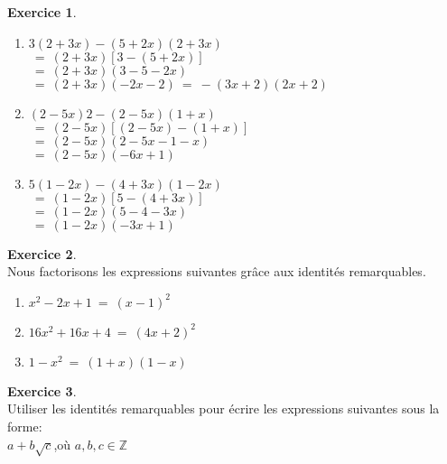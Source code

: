\documentclass[10pt,a4paper]{article}
\theoremstyle{definition}
\theoremstyle{definition}
\newtheorem{exo}{Exercice}
\begin{document}
\begin{center}
\begin{minipage}[c]{0.4\linewidth}
\begin{exo}
				\begin{enumerate}
					\item $3(2 + 3x) - (5 + 2x)(2 + 3x)$\\
					$\ = \ (2 + 3x)\left[3 - (5 + 2x)\right]$\\
					$\ = \ (2 + 3x)(3 - 5 - 2x) $\\
					$  \  =  \  (2 + 3x)(-2x-2)  \  =  \ - (3x+2)(2x+2) $
					\item $(2 - 5x)2 - (2 - 5x)(1 + x)$\\
					$ \ = \ (2 - 5x)\left[(2 - 5x) - (1 + x)\right] $\\
					$ \ = \ (2 - 5x)(2 - 5x - 1 - x) $\\
					$ \ = \ (2 - 5x)(- 6x + 1) $
					\item $5(1 - 2x) - (4 + 3x)(1-2x)$\\
					$ \ = \ (1 - 2x)\left[ 5 - (4 + 3x)\right]$\\
					$ \ = \ (1 - 2x)(5 - 4 - 3x)$\\
					$ \ = \ (1 - 2x)( - 3x + 1)$
				\end{enumerate}
			
		\end{exo}
		\begin{exo}\quad\hfill\textbf{}\\
			Nous factorisons les expressions suivantes grâce aux identités remarquables.
		
				\begin{enumerate}
					\item $x^2-2x+1  \ = \ (x-1)^2$
					\item $16x^2+16x+4 \ = \ (4x+2)^2 $
					
					\item $1-x^2  \ =  \ (1+x)(1-x)$
				\end{enumerate}

		\end{exo}
		\begin{exo}\quad\hfill\textbf{}\\
			Utiliser les identités remarquables pour écrire les expressions suivantes
			sous la forme:\\
			 $a+b\sqrt c$,\quad où \quad $a, b, c\in \mathbb{Z}$ \hspace{3cm}


\end{exo}
\end{minipage}
\end{center}
\end{document}
